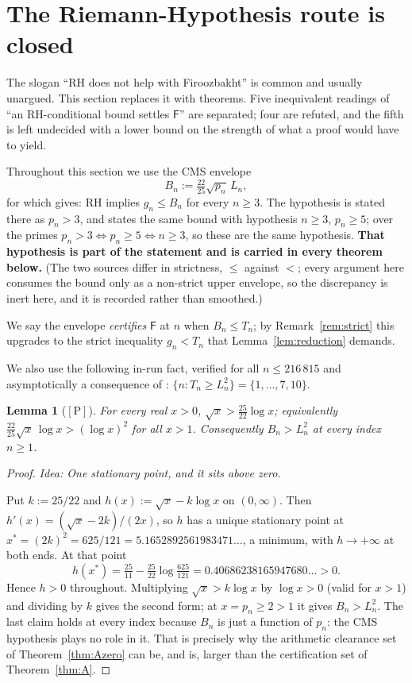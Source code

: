 \documentclass[11pt,a4paper]{article}
\theoremstyle{plain}
\newtheorem{lemma}[theorem]{Lemma}
\theoremstyle{definition}
\theoremstyle{remark}
\newcommand{\idea}[1]{\emph{Idea: #1}\par\smallskip}
\newcommand{\cP}{{[\mathrm{P}]}}
\newcommand{\Fb}{\mathsf{F}}
\begin{document}
\section{The Riemann-Hypothesis route is closed}
\label{sec:rh}

The slogan ``RH does not help with Firoozbakht'' is common and usually unargued. This section
replaces it with theorems. Five inequivalent readings of ``an RH-conditional bound settles
$\Fb$'' are separated; four are refuted, and the fifth is left undecided with a lower bound
on the strength of what a proof would have to yield.

Throughout this section we use the CMS envelope
\[
B_n := \tfrac{22}{25}\sqrt{p_n}\, L_n ,
\]
for which \cite[\S1.2, Thm.~5]{carneiro2019fourier} gives: RH implies $g_n \le B_n$ for every
$n \ge 3$. The hypothesis is stated there as $p_n > 3$, and
\cite[Thm.~1, eq.~(1.4)]{visser2018andrica} states the same bound with hypothesis
$n \ge 3$, $p_n \ge 5$; over the primes $p_n > 3 \iff p_n \ge 5 \iff n \ge 3$, so these are the
same hypothesis. \textbf{That hypothesis is part of the statement and is carried in every
theorem below.} (The two sources differ in strictness, $\le$ against $<$; every argument here
consumes the bound only as a non-strict upper envelope, so the discrepancy is inert here, and it
is recorded rather than smoothed.)

We say the envelope \emph{certifies} $\Fb$ at $n$ when $B_n \le T_n$; by
Remark~\ref{rem:strict} this upgrades to the strict inequality $g_n < T_n$ that
Lemma~\ref{lem:reduction} demands.

We also use the following in-run fact, verified for all $n \le 216\,815$ and asymptotically a
consequence of \cite[Thm.~6.9]{dusart2010estimates}: $\{n : T_n \ge L_n^2\} = \{1,\dots,7,10\}$.

\begin{lemma}[$\cP$]
\label{lem:A1}
For every real $x > 0$, $\sqrt{x} > \tfrac{25}{22}\log x$; equivalently
$\tfrac{22}{25}\sqrt{x}\,\log x > (\log x)^2$ for all $x > 1$. Consequently $B_n > L_n^2$ at
\emph{every} index $n \ge 1$.
\end{lemma}

\begin{proof}
\idea{One stationary point, and it sits above zero.}
Put $k := 25/22$ and $h(x) := \sqrt{x} - k\log x$ on $(0,\infty)$. Then
$h'(x) = (\sqrt{x} - 2k)/(2x)$, so $h$ has a unique stationary point at
$x^* = (2k)^2 = 625/121 = 5.1652892561983471\ldots$, a minimum, with $h \to +\infty$ at both
ends. At that point
\[
h(x^*) = \tfrac{25}{11} - \tfrac{25}{22}\log\tfrac{625}{121} = 0.40686238165947680\ldots > 0 .
\]
Hence $h > 0$ throughout. Multiplying $\sqrt{x} > k\log x$ by $\log x > 0$ (valid for
$x > 1$) and dividing by $k$ gives the second form; at $x = p_n \ge 2 > 1$ it gives
$B_n > L_n^2$. The last claim holds at every index because $B_n$ is just a function of $p_n$:
the CMS hypothesis plays no role in it. That is precisely why the arithmetic clearance set of
Theorem~\ref{thm:Azero} can be, and is, larger than the certification set of
Theorem~\ref{thm:A}.
\end{proof}
\end{document}
